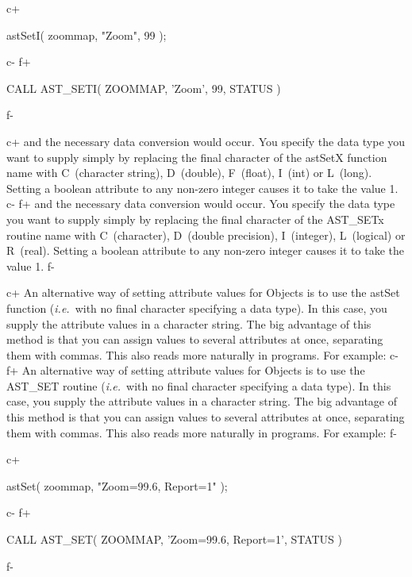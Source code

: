 \documentclass[twoside,11pt]{starlink}
\begin{document}
c+
\small
\begin{terminalv}
astSetI( zoommap, "Zoom", 99 );
\end{terminalv}
\normalsize
c-
f+
\small
\begin{terminalv}
      CALL AST_SETI( ZOOMMAP, 'Zoom', 99, STATUS )
\end{terminalv}
\normalsize
f-

c+
and the necessary data conversion would occur.  You specify the data
type you want to supply simply by replacing the final character of the
astSetX function name with C~(character string), D~(double),
F~(float), I~(int) or L~(long). Setting a boolean attribute to any
non-zero integer causes it to take the value 1.
c-
f+
and the necessary data conversion would occur.  You specify the data
type you want to supply simply by replacing the final character of the
AST\_SETx routine name with C~(character), D~(double precision),
I~(integer), L~(logical) or R~(real).  Setting a boolean attribute to
any non-zero integer causes it to take the value 1.
f-

c+
An alternative way of setting attribute values for Objects is to use
the astSet function (\emph{i.e.}\ with no final character specifying a
data type). In this case, you supply the attribute values in a
character string. The big advantage of this method is that you can
assign values to several attributes at once, separating them with
commas. This also reads more naturally in programs. For example:
c-
f+
An alternative way of setting attribute values for Objects is to use
the AST\_SET routine (\emph{i.e.}\ with no final character specifying
a data type). In this case, you supply the attribute values in a
character string. The big advantage of this method is that you can
assign values to several attributes at once, separating them with
commas. This also reads more naturally in programs. For example:
f-

c+
\small
\begin{terminalv}
astSet( zoommap, "Zoom=99.6, Report=1" );
\end{terminalv}
\normalsize
c-
f+
\small
\begin{terminalv}
      CALL AST_SET( ZOOMMAP, 'Zoom=99.6, Report=1', STATUS )
\end{terminalv}
\normalsize
f-
\end{document}
